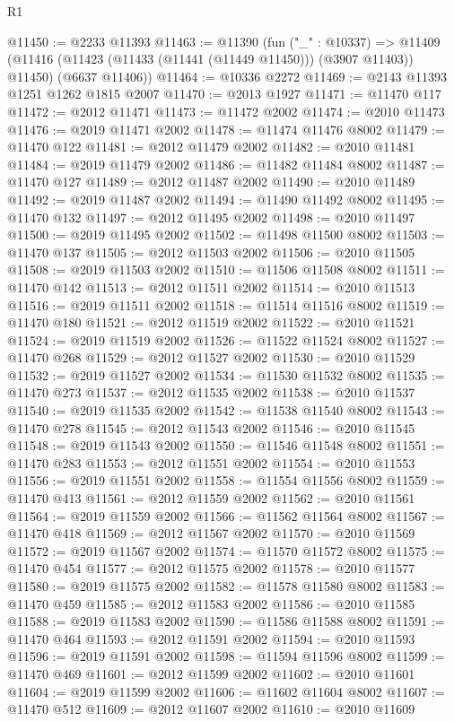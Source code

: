 \begin{lexlean}{R1}
\begin{coremodule}
@11450 := @2233 @11393
@11463 := @11390
    (fun ("_" : @10337) =>
    @11409 (@11416 (@11423 (@11433 (@11441 (@11449 @11450))) (@3907 @11403)) @11450) (@6637 @11406))
@11464 := @10336 @2272
@11469 := @2143 @11393 @1251 @1262 @1815 @2007
@11470 := @2013 @1927
@11471 := @11470 @117
@11472 := @2012 @11471
@11473 := @11472 @2002
@11474 := @2010 @11473
@11476 := @2019 @11471 @2002
@11478 := @11474 @11476 @8002
@11479 := @11470 @122
@11481 := @2012 @11479 @2002
@11482 := @2010 @11481
@11484 := @2019 @11479 @2002
@11486 := @11482 @11484 @8002
@11487 := @11470 @127
@11489 := @2012 @11487 @2002
@11490 := @2010 @11489
@11492 := @2019 @11487 @2002
@11494 := @11490 @11492 @8002
@11495 := @11470 @132
@11497 := @2012 @11495 @2002
@11498 := @2010 @11497
@11500 := @2019 @11495 @2002
@11502 := @11498 @11500 @8002
@11503 := @11470 @137
@11505 := @2012 @11503 @2002
@11506 := @2010 @11505
@11508 := @2019 @11503 @2002
@11510 := @11506 @11508 @8002
@11511 := @11470 @142
@11513 := @2012 @11511 @2002
@11514 := @2010 @11513
@11516 := @2019 @11511 @2002
@11518 := @11514 @11516 @8002
@11519 := @11470 @180
@11521 := @2012 @11519 @2002
@11522 := @2010 @11521
@11524 := @2019 @11519 @2002
@11526 := @11522 @11524 @8002
@11527 := @11470 @268
@11529 := @2012 @11527 @2002
@11530 := @2010 @11529
@11532 := @2019 @11527 @2002
@11534 := @11530 @11532 @8002
@11535 := @11470 @273
@11537 := @2012 @11535 @2002
@11538 := @2010 @11537
@11540 := @2019 @11535 @2002
@11542 := @11538 @11540 @8002
@11543 := @11470 @278
@11545 := @2012 @11543 @2002
@11546 := @2010 @11545
@11548 := @2019 @11543 @2002
@11550 := @11546 @11548 @8002
@11551 := @11470 @283
@11553 := @2012 @11551 @2002
@11554 := @2010 @11553
@11556 := @2019 @11551 @2002
@11558 := @11554 @11556 @8002
@11559 := @11470 @413
@11561 := @2012 @11559 @2002
@11562 := @2010 @11561
@11564 := @2019 @11559 @2002
@11566 := @11562 @11564 @8002
@11567 := @11470 @418
@11569 := @2012 @11567 @2002
@11570 := @2010 @11569
@11572 := @2019 @11567 @2002
@11574 := @11570 @11572 @8002
@11575 := @11470 @454
@11577 := @2012 @11575 @2002
@11578 := @2010 @11577
@11580 := @2019 @11575 @2002
@11582 := @11578 @11580 @8002
@11583 := @11470 @459
@11585 := @2012 @11583 @2002
@11586 := @2010 @11585
@11588 := @2019 @11583 @2002
@11590 := @11586 @11588 @8002
@11591 := @11470 @464
@11593 := @2012 @11591 @2002
@11594 := @2010 @11593
@11596 := @2019 @11591 @2002
@11598 := @11594 @11596 @8002
@11599 := @11470 @469
@11601 := @2012 @11599 @2002
@11602 := @2010 @11601
@11604 := @2019 @11599 @2002
@11606 := @11602 @11604 @8002
@11607 := @11470 @512
@11609 := @2012 @11607 @2002
@11610 := @2010 @11609

\end{coremodule}
\end{lexlean}
